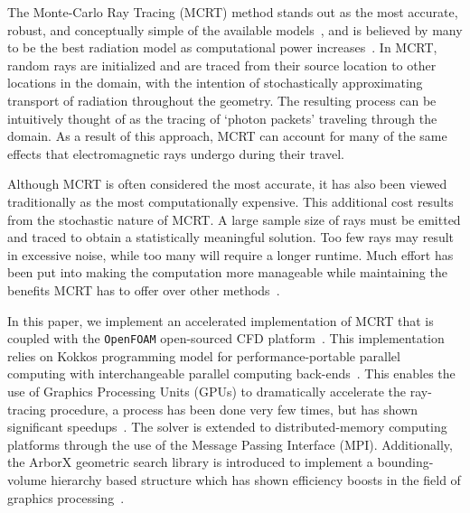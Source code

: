 The Monte-Carlo Ray Tracing (MCRT) method stands out as the most accurate, robust, and conceptually simple of the available models~\cite{Tesse2002RadiativeApproach,Modest2013RadiativeTransfer,Coelho2018RadiativeSystems}, and is believed by many to be the best radiation model as computational power increases~\cite{Howell2010ThermalTransfer}.
In MCRT, random rays are initialized and are traced from their source location to other locations in the domain, with the intention of stochastically approximating transport of radiation throughout the geometry.
The resulting process can be intuitively thought of as the tracing of `photon packets' traveling through the domain.
As a result of this approach, MCRT can account for many of the same effects that electromagnetic rays undergo during their travel.

Although MCRT is often considered the most accurate, it has also been viewed traditionally as the most computationally expensive.
This additional cost results from the stochastic nature of MCRT. A large sample size of rays must be emitted and traced to obtain a statistically meaningful solution. 
Too few rays may result in excessive noise, while too many will require a longer runtime.
Much effort has been put into making the computation more manageable while maintaining the benefits MCRT has to offer over other methods~\cite{Liu2020TheFlames,Tesse2002RadiativeApproach,Zeeb2001AnGeometries,Modest2003BackwardTransfer,Howell2010ThermalTransfer}.

In this paper, we implement an accelerated implementation of MCRT that is coupled with the \verb|OpenFOAM| open-sourced CFD platform~\cite{Weller1998ATechniques}. 
This implementation relies on Kokkos programming model for performance-portable parallel computing with interchangeable parallel computing back-ends~\cite{Trott2021KokkosEra}. This enables the use of Graphics Processing Units (GPUs) to dramatically accelerate the ray-tracing procedure, a process has been done very few times, but has shown significant speedups~\cite{Silvestri2019ASimulation,Humphrey2016RadiativeRefinement,Heymann2012GPU-basedAGN}. 
The solver is extended to distributed-memory computing platforms through the use of the Message Passing Interface (MPI).
Additionally, the ArborX geometric search library is introduced to implement a bounding-volume hierarchy based structure which has shown efficiency boosts in the field of graphics processing~\cite{Lebrun-Grandie2019ArborX:Library}. 

